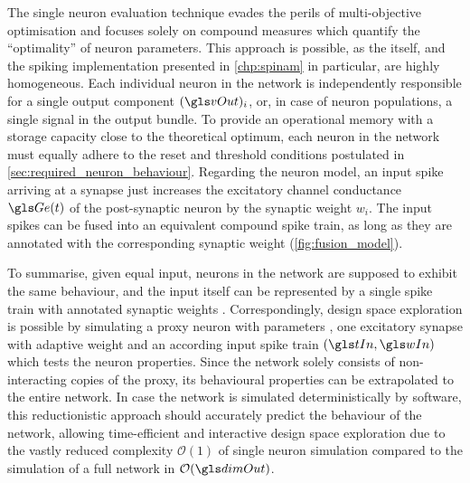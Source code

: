 The single neuron evaluation technique evades the perils of multi-objective optimisation and focuses solely on compound measures which quantify the \enquote{optimality} of neuron parameters. This approach is possible, as the \BiNAM itself, and the spiking \BiNAM implementation presented in \cref{chp:spinam} in particular, are highly homogeneous. Each individual neuron in the network is independently responsible for a single output component $(\vOut)_i$, or, in case of neuron populations, a single signal in the output bundle. To provide an operational memory with a storage capacity close to the theoretical optimum, each neuron in the network must equally adhere to the reset and threshold conditions postulated in \cref{sec:required_neuron_behaviour}. Regarding the neuron model, an input spike arriving at a synapse just increases the excitatory channel conductance $\Ge(t)$ of the post-synaptic neuron by the synaptic weight $w_i$. The input spikes can be fused into an equivalent compound spike train, as long as they are annotated with the corresponding synaptic weight (\cref{fig:fusion_model}).

To summarise, given equal input, neurons in the network are supposed to exhibit the same behaviour, and the input itself can be represented by a single spike train \tIn with annotated synaptic weights \wIn. Correspondingly, design space exploration is possible by simulating a proxy neuron with parameters \nParams, one excitatory synapse with adaptive weight and an according input spike train $(\tIn, \wIn)$ which tests the neuron properties. Since the network solely consists of non-interacting copies of the proxy, its behavioural properties can be extrapolated to the entire network. In case the network is simulated deterministically by software, this reductionistic approach should accurately predict the behaviour of the network, allowing time-efficient and interactive design space exploration due to the vastly reduced complexity $\mathcal{O}(1)$ of single neuron simulation compared to the simulation of a full network in $\mathcal{O}(\dimOut)$.

